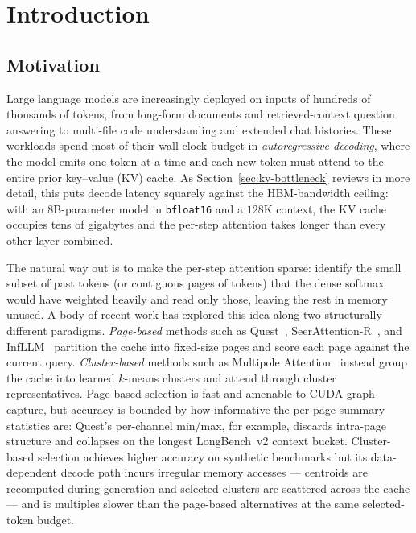 \chapter{Introduction}\label{chap:introduction}


\section{Motivation}\label{sec:motivation}

Large language models are increasingly deployed on inputs of hundreds
of thousands of tokens, from long-form documents and retrieved-context
question answering to multi-file code understanding and extended
chat histories.  These workloads spend most of their wall-clock
budget in \emph{autoregressive decoding}, where the model emits one
token at a time and each new token must attend to the entire prior
key--value (KV) cache.  As Section~\ref{sec:kv-bottleneck} reviews in
more detail, this puts decode latency squarely against the
HBM-bandwidth ceiling: with an 8B-parameter model in \texttt{bfloat16}
and a $128$K context, the KV cache occupies tens of gigabytes and the
per-step attention takes longer than every other layer combined.

The natural way out is to make the per-step attention sparse:
identify the small subset of past tokens (or contiguous pages of
tokens) that the dense softmax would have weighted heavily and read
only those, leaving the rest in memory unused.  A body of recent work
has explored this idea along two structurally different paradigms.
\emph{Page-based} methods such as
Quest~\cite{tang2024quest}, SeerAttention-R~\cite{gao2025seerattention},
and InfLLM~\cite{xiao2024infllm} partition the cache into fixed-size
pages and score each page against the current query.
\emph{Cluster-based} methods such as
Multipole Attention~\cite{hooper2025multipole} instead group the cache
into learned $k$-means clusters and attend through cluster
representatives.  Page-based selection is fast and amenable to
CUDA-graph capture, but accuracy is bounded by how informative the
per-page summary statistics are: Quest's per-channel min/max, for
example, discards intra-page structure and collapses on the longest
LongBench~v2 context bucket.  Cluster-based selection achieves higher
accuracy on synthetic benchmarks but its data-dependent decode path
incurs irregular memory accesses --- centroids are recomputed during
generation and selected clusters are scattered across the cache ---
and is multiples slower than the page-based alternatives at the same
selected-token budget.

